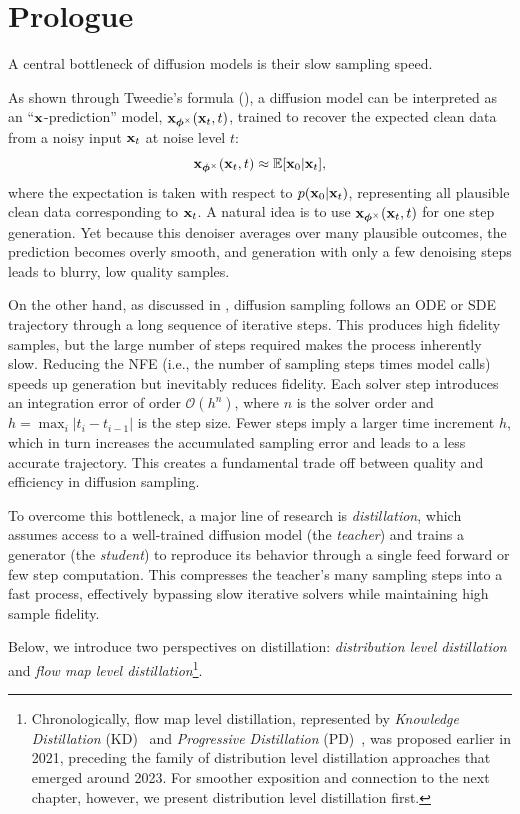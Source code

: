 \section{Prologue}\label{sec:distillation-prologue}
A central bottleneck of diffusion models is their slow sampling speed.  

As shown through Tweedie's formula (), a diffusion model can be interpreted as an ``${\mathbf{x}}$-prediction'' model, ${\mathbf{x}}_{\bm{\phi}^\times}({\mathbf{x}}_t, t)$, trained to recover the expected clean data from a noisy input ${\mathbf{x}}_t$ at noise level $t$:
\[
    {\mathbf{x}}_{\bm{\phi}^\times}({\mathbf{x}}_t, t) \approx \mathbb{E}[{\mathbf{x}}_0 |{\mathbf{x}}_t],
\]
where the expectation is taken with respect to $p({\mathbf{x}}_0 |{\mathbf{x}}_t)$, representing all plausible clean data corresponding to ${\mathbf{x}}_t$.  
A natural idea is to use ${\mathbf{x}}_{\bm{\phi}^\times}({\mathbf{x}}_t, t)$ for one step generation. Yet because this denoiser averages over many plausible outcomes, the prediction becomes overly smooth, and generation with only a few denoising steps leads to blurry, low quality samples.  

On the other hand, as discussed in , diffusion sampling follows an ODE or SDE trajectory through a long sequence of iterative steps. This produces high fidelity samples, but the large number of steps required makes the process inherently slow. Reducing the NFE (i.e., the number of sampling steps times model calls) speeds up generation but inevitably reduces fidelity. 
Each solver step introduces an integration error of order $\mathcal{O}(h^{n})$, 
where $n$ is the solver order and $h=\max_i |t_i - t_{i-1}|$ is the step size.
Fewer steps imply a larger time increment $h$, which in turn increases the accumulated sampling error and leads to a less accurate trajectory.
 This creates a fundamental trade off between quality and efficiency in diffusion sampling.  

To overcome this bottleneck, a major line of research is \emph{distillation}, which assumes access to a well-trained diffusion model (the \emph{teacher}) and trains a generator (the \emph{student}) to reproduce its behavior through a single feed forward or few step computation. 
This compresses the teacher’s many sampling steps into a fast process, effectively bypassing slow iterative solvers while maintaining high sample fidelity.




Below, we introduce two perspectives on distillation: \emph{distribution level distillation} and \emph{flow map level distillation}\footnote{Chronologically, flow map level distillation, represented by \emph{Knowledge Distillation} (KD)~\citep{luhman2021knowledge} and \emph{Progressive Distillation} (PD)~\citep{ho2020denoising}, was proposed earlier in 2021, preceding the family of distribution level distillation approaches that emerged around 2023. For smoother exposition and connection to the next chapter, however, we present distribution level distillation first.}.





